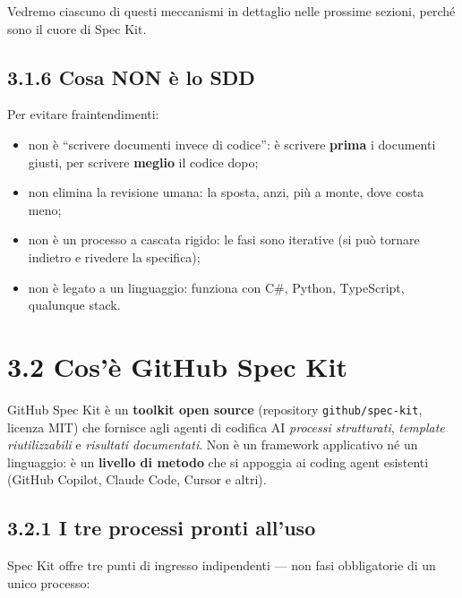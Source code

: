 \documentclass[
  italian,
  10pt,
]{book}
\providecommand{\tightlist}{%
  \setlength{\itemsep}{0pt}\setlength{\parskip}{0pt}}
\begin{document}
Vedremo ciascuno di questi meccanismi in dettaglio nelle prossime
sezioni, perché sono il cuore di Spec Kit.

\subsection{3.1.6 Cosa NON è lo SDD}\label{cosa-non-uxe8-lo-sdd}

Per evitare fraintendimenti:

\begin{itemize}
\tightlist
\item
  non è ``scrivere documenti invece di codice'': è scrivere
  \textbf{prima} i documenti giusti, per scrivere \textbf{meglio} il
  codice dopo;
\item
  non elimina la revisione umana: la sposta, anzi, più a monte, dove
  costa meno;
\item
  non è un processo a cascata rigido: le fasi sono iterative (si può
  tornare indietro e rivedere la specifica);
\item
  non è legato a un linguaggio: funziona con C\#, Python, TypeScript,
  qualunque stack.
\end{itemize}

\section{3.2 Cos'è GitHub Spec Kit}\label{cosuxe8-github-spec-kit}

GitHub Spec Kit è un \textbf{toolkit open source} (repository
\texttt{github/spec-kit}, licenza MIT) che fornisce agli agenti di
codifica AI \emph{processi strutturati}, \emph{template riutilizzabili}
e \emph{risultati documentati}. Non è un framework applicativo né un
linguaggio: è un \textbf{livello di metodo} che si appoggia ai coding
agent esistenti (GitHub Copilot, Claude Code, Cursor e altri).

\subsection{3.2.1 I tre processi pronti
all'uso}\label{i-tre-processi-pronti-alluso}

Spec Kit offre tre punti di ingresso indipendenti --- non fasi
obbligatorie di un unico processo:
\end{document}
